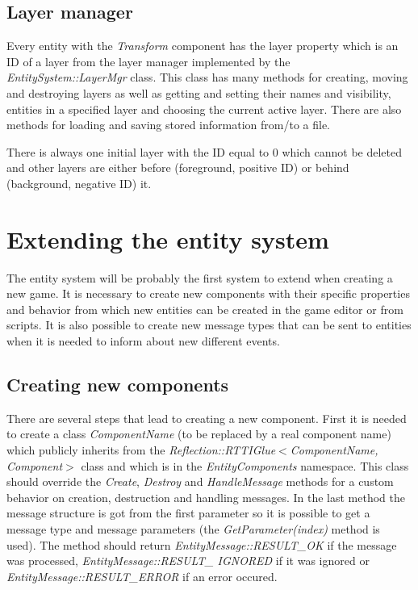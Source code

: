 \subsection{Layer manager}

Every entity with the \emph{Transform} component has the layer property which is an ID of a layer from the layer manager implemented by the \emph{EntitySystem::LayerMgr} class. This class has many methods for creating, moving and destroying layers as well as getting and setting their names and visibility, entities in a specified layer and choosing the current active layer. There are also methods for loading and saving stored information from/to a file.

There is always one initial layer with the ID equal to 0 which cannot be deleted and other layers are either before (foreground, positive ID) or behind (background, negative ID) it.


\section{Extending the entity system}
\label{sec:entity-extending}

The entity system will be probably the first system to extend when creating a new game. It is necessary to create new components with their specific properties and behavior from which new entities can be created in the game editor or from scripts. It is also possible to create new message types that can be sent to entities when it is needed to inform about new different events.

\subsection{Creating new components}
\label{sub:entity-newcomponents}

There are several steps that lead to creating a new component. First it is needed to create a class \emph{ComponentName} (to be replaced by a real component name) which publicly inherits from the \emph{Reflection::RTTIGlue$<$Component\-Name, Component$>$} class and which is in the \emph{EntityComponents} namespace. This class should override the \emph{Create}, \emph{Destroy} and \emph{HandleMessage} methods for a custom behavior on creation, destruction and handling messages. In the last method the message structure is got from the first parameter so it is possible to get a message type and message parameters (the \emph{GetParameter(index)} method is used). The method should return \emph{EntityMessage::RESULT\_OK} if the message was processed, \emph{EntityMessage::RESULT\_ IGNORED} if it was ignored or \emph{EntityMessage::RESULT\_ERROR} if an error occured.

